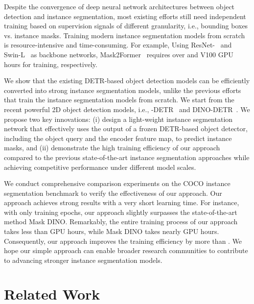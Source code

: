 \documentclass[10pt,twocolumn,letterpaper]{article}
\begin{document}
Despite the convergence of deep neural network architectures between object detection and instance segmentation, most existing efforts still need independent training based on supervision signals of different granularity, i.e., bounding boxes vs. instance masks. Training modern instance segmentation models from scratch is resource-intensive and time-consuming. For example, Using ResNet-~\cite{He2016ResNet} and Swin-L~\cite{liu2021swin} as backbone networks, Mask2Former~\cite{cheng2022masked} requires over  and  V100 GPU hours for training, respectively.

We show that the existing DETR-based object detection models can be efficiently converted into strong instance segmentation models, unlike the previous efforts that train the instance segmentation models from scratch. We start from the recent powerful 2D object detection models, i.e., -DETR~\cite{jia2022detrs} and DINO-DETR~\cite{zhang2022dino}. We propose two key innovations: (i) design a light-weight instance segmentation network that effectively uses the output of a frozen DETR-based object detector, including the object query and the encoder feature map, to predict instance masks, and (ii) demonstrate the high training efficiency of our approach compared to the previous state-of-the-art instance segmentation approaches while achieving competitive performance under different model scales.


We conduct comprehensive comparison experiments on the COCO instance segmentation benchmark to verify the effectiveness of our approach. Our approach achieves strong results with a very short learning time. For instance, with only  training epochs, our approach slightly surpasses the state-of-the-art method Mask DINO. Remarkably, the entire training process of our approach takes less than  GPU hours, while Mask DINO takes nearly  GPU hours. Consequently, our approach improves the training efficiency by more than . We hope our simple approach can enable broader research communities to contribute to advancing stronger instance segmentation models.


\section{Related Work}
\end{document}
